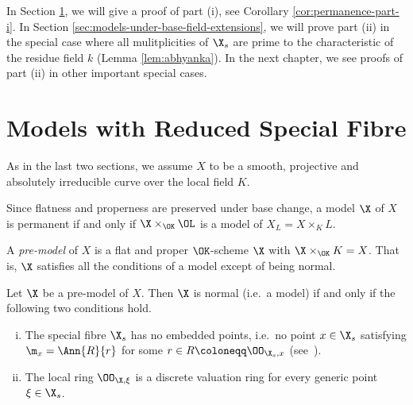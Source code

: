 In Section \ref{sec:models-with-reduced-special-fibre}, we will give a proof of part (i), see Corollary \ref{cor:permanence-part-i}.
In Section \ref{sec:models-under-base-field-extensions}, we will prove part (ii) in the special case where all mulitplicities of $\X_s$
are prime to the characteristic of the residue field $k$ (Lemma \ref{lem:abhyanka}).
In the next chapter, we see proofs of part (ii) in other important special cases.

\section{Models with Reduced Special Fibre}\label{sec:models-with-reduced-special-fibre}

As in the last two sections, we assume $X$ to be a smooth, projective and absolutely irreducible curve over the local
field $K$.


\begin{remark}
    Since flatness and properness are preserved under base change, a model $\X$ of $X$ is permanent if and only if
    $\X \times_{\OK} \OL$ is a model of $X_L = X \times_K L$.
\end{remark}

\begin{definition}
    A \textit{pre-model} of $X$ is a flat and proper $\OK$-scheme $\X$ with $\X \times_{\OK} K = X$.
    That is, $\X$ satisfies all the conditions of a model except of being normal.
\end{definition}

\begin{lemma}\label{lem:conditions-for-normality}
    Let $\X$ be a pre-model of $X$.
    Then $\X$ is normal (i.e.\ a model) if and only if the following two conditions hold.
    \begin{enumerate}[(i)]
        \item The special fibre $\X_s$ has no embedded points, i.e.\ no point $x\in \X_s$ \label{lem:conditions-for-normality-i}
            satisfying $\m_x = \Ann{R}{r}$ for some $r\in R \coloneqq \OO_{\X_s,x}$ (see~\cite[Definition 7.1.6]{Liu}).
        \item The local ring $\OO_{\X,\xi}$ is a discrete valuation ring for every generic point $\xi \in \X_s$. \label{lem:conditions-for-normality-ii}
    \end{enumerate}
\end{lemma}

